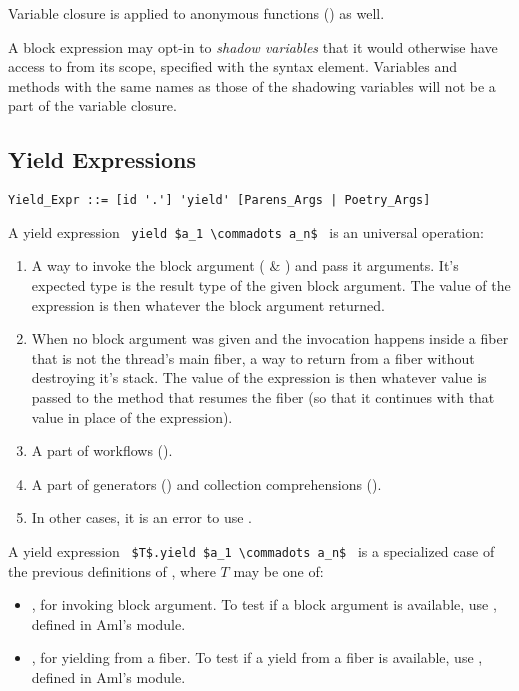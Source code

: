 Variable closure is applied to anonymous functions () as well. 

A block expression may opt-in to {\em shadow variables} that it would otherwise have access to from its scope, specified with the  syntax element. Variables and methods with the same names as those of the shadowing variables will not be a part of the variable closure. 





\subsection{Yield Expressions}
\label{sec:yield-expressions}

\syntax\begin{lstlisting}
Yield_Expr ::= [id '.'] 'yield' [Parens_Args | Poetry_Args]
\end{lstlisting}

A yield expression ~\lstinline!yield $a_1 \commadots a_n$!~ is an universal  operation:
\begin{enumerate}
  \item A way to invoke the block argument ( \& ) and pass it arguments. It's expected type is the result type of the given block argument. The value of the expression is then whatever the block argument returned. 
  \item When no block argument was given and the invocation happens inside a fiber that is not the thread's main fiber, a way to return from a fiber without destroying it's stack. The value of the expression is then whatever value is passed to the method that resumes the fiber (so that it continues with that value in place of the  expression). 
  \item A part of workflows ().
  \item A part of generators () and collection comprehensions ().
  \item In other cases, it is an error to use . 
\end{enumerate}

A yield expression ~\lstinline!$T$.yield $a_1 \commadots a_n$!~ is a specialized case of the previous definitions of , where $T$ may be one of:
\begin{itemize}
  \item {}, for invoking block argument. To test if a block argument is available, use , defined in Aml's  module. 
  \item {}, for yielding from a fiber. To test if a yield from a fiber is available, use , defined in Aml's  module. 
\end{itemize}





